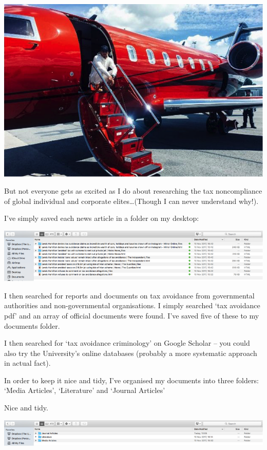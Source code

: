 \documentclass[]{book}
\theoremstyle{definition}
\theoremstyle{definition}
\theoremstyle{definition}
\theoremstyle{remark}
\begin{document}
\includegraphics{imgs/qual_02.png}

But not everyone gets as excited as I do about researching the tax
noncompliance of global individual and corporate elites\ldots{}(Though I
can never understand why!).

I've simply saved each news article in a folder on my desktop:

\includegraphics{imgs/qual_03.png}

I then searched for reports and documents on tax avoidance from
governmental authorities and non-governmental organisations. I simply
searched `tax avoidance pdf' and an array of official documents were
found. I've saved five of these to my documents folder.

I then searched for `tax avoidance criminology' on Google Scholar -- you
could also try the University's online databases (probably a more
systematic approach in actual fact).

In order to keep it nice and tidy, I've organised my documents into
three folders: `Media Articles', `Literature' and `Journal Articles'

Nice and tidy.

\includegraphics{imgs/qual_04.png}
\end{document}
